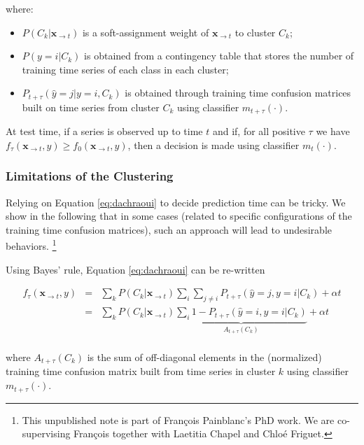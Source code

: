 where:

\begin{itemize}
\item $P(C_k | \mathbf{x}_{\rightarrow t})$ is a soft-assignment weight of
$\mathbf{x}_{\rightarrow t}$ to cluster $C_k$;
\item $P(y=i | C_k)$ is obtained from a contingency table that stores the number of
training time series of each class in each cluster;
\item $P_{t+\tau}(\hat{y} = j | y=i, C_k)$ is obtained through training time
confusion matrices built on time series from cluster $C_k$ using classifier
$m_{t+\tau}(\cdot)$.
\end{itemize}

At test time, if a series is observed up to time $t$ and if, for all positive
$\tau$ we have
$f_\tau(\mathbf{x}_{\rightarrow t}, y) \geq f_0(\mathbf{x}_{\rightarrow t}, y)$,
then a decision is made using classifier $m_t(\cdot)$.

\subsubsection{Limitations of the Clustering}

Relying on Equation \eqref{eq:dachraoui} to decide prediction time can be
tricky. We show in the following that in some cases (related to specific
configurations of the training time confusion matrices), such an approach will
lead to undesirable behaviors.%
\footnote{This unpublished note is part of François Painblanc's PhD work.
We are co-supervising François together with Laetitia Chapel and Chloé Friguet.}

Using Bayes' rule, Equation \eqref{eq:dachraoui} can be re-written

\begin{eqnarray}
    f_\tau(\mathbf{x}_{\rightarrow t}, y) &=&
        \sum_k P(C_k | \mathbf{x}_{\rightarrow t})
        \sum_i
        \sum_{j \neq i} P_{t+\tau}(\hat{y} = j, y=i | C_k)
        + \alpha t \\
    &=&
        \sum_k P(C_k | \mathbf{x}_{\rightarrow t})
        \underbrace{\sum_i 1 - P_{t+\tau}(\hat{y} = i, y=i | C_k)}_{A_{t+\tau}(C_k)}
        + \alpha t \\
\end{eqnarray}

where $A_{t+\tau}(C_k)$ is the sum of off-diagonal elements in the (normalized)
training time confusion matrix built from time series in cluster $k$ using
classifier $m_{t+\tau}(\cdot)$.

